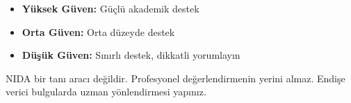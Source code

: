 \begin{itemize}
  \item \textbf{Yüksek Güven:} Güçlü akademik destek
  \item \textbf{Orta Güven:} Orta düzeyde destek
  \item \textbf{Düşük Güven:} Sınırlı destek, dikkatli yorumlayın
\end{itemize}

\begin{warningbox}
NIDA bir tanı aracı değildir. Profesyonel değerlendirmenin yerini almaz. Endişe verici bulgularda uzman yönlendirmesi yapınız.
\end{warningbox}

\newpage
